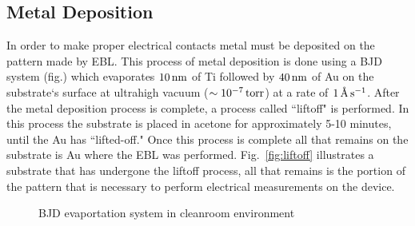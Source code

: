 \subsection{Metal Deposition}\label{subsec:deposition}
In order to make proper electrical contacts metal must be deposited on the pattern made by \acs{EBL}. This process of metal deposition is done using a \ac{BJD} system (fig.) which evaporates $10\,\mathrm{nm}$ of \ac{Ti} followed by $40\,\mathrm{nm}$ of \acs{Au} on the substrate`s surface at ultrahigh vacuum ($\sim 10^{-7}\,\mathrm{torr}$) at a rate of $\SI{1}{\angstrom}\,\mathrm{s}^{-1}$. After the metal deposition process is complete, a process called ``liftoff" is performed. In this process the substrate is placed in acetone for approximately 5-10 minutes, until the \acs{Au} has ``lifted-off." Once this process is complete all that remains on the substrate is \acs{Au} where the \acs{EBL} was performed. Fig.~\ref{fig:liftoff} illustrates a substrate that has undergone the liftoff process, all that remains is the portion of the pattern that is necessary to perform electrical measurements on the device. 
\begin{figure}[ht]
	\centering
	\qquad
	\caption[\acs{BJD} system]{\acs{BJD} evaportation system in cleanroom environment}
	\label{fig:bjd_system}
\end{figure}

